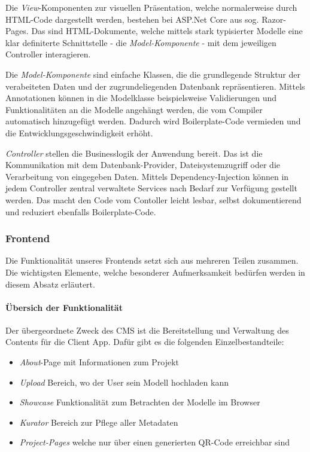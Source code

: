 \documentclass[titlepage, a4paper, 11pt]{scrartcl}
\begin{document}
        Die \textit{View}-Komponenten zur visuellen Präsentation, welche normalerweise durch HTML-Code dargestellt werden, bestehen bei ASP.Net Core aus sog. Razor-Pages.
        Das sind HTML-Dokumente, welche mittels stark typisierter Modelle eine klar definiterte Schnittstelle - die \textit{Model-Komponente} - mit dem jeweiligen Controller interagieren.

        Die \textit{Model-Komponente} sind einfache Klassen, die die grundlegende Struktur der verabeiteten Daten und der zugrundeliegenden Datenbank repräsentieren.
        Mittels Annotationen können in die Modelklasse beispielsweise Validierungen und Funktionalitäten an die Modelle angehängt werden, die vom Compiler automatisch hinzugefügt werden.
        Dadurch wird Boilerplate-Code vermieden und die Entwicklungsgeschwindigkeit erhöht.

        \textit{Controller} stellen die Businesslogik der Anwendung bereit. Das ist die Kommunikation mit dem Datenbank-Provider, Dateisystemzugriff oder die Verarbeitung von eingegeben Daten.
        Mittels Dependency-Injection können in jedem Controller zentral verwaltete Services nach Bedarf zur Verfügung gestellt werden. Das macht den Code vom Contoller leicht lesbar, selbst dokumentierend
        und reduziert ebenfalls Boilerplate-Code.

      \subsubsection{Frontend}

        Die Funktionalität unseres Frontends setzt sich aus mehreren Teilen zusammen. Die wichtigsten Elemente, welche besonderer Aufmerksamkeit bedürfen werden in diesem Absatz erläutert.

        \paragraph{Übersich der Funktionalität}

          Der übergeordnete Zweck des CMS ist die Bereitstellung und Verwaltung des Contents für die Client App. Dafür gibt es die folgenden Einzelbestandteile:

          \begin{itemize}
            \item \textit{About}-Page mit Informationen zum Projekt
            \item \textit{Upload} Bereich, wo der User sein Modell hochladen kann
            \item \textit{Showcase} Funktionalität zum Betrachten der Modelle im Browser
            \item \textit{Kurator} Bereich zur Pflege aller Metadaten
            \item \textit{Project-Pages} welche nur über einen generierten QR-Code erreichbar sind
          \end{itemize}
          
\end{document}
